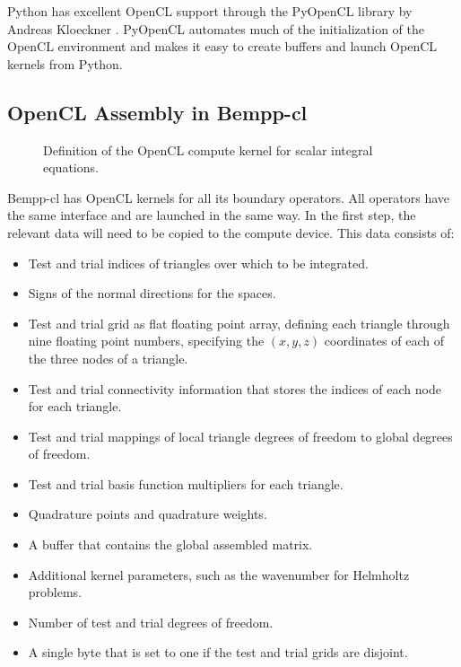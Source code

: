 Python has excellent OpenCL support through the PyOpenCL library by Andreas Kloeckner \cite{pyopencl}. PyOpenCL automates much of the initialization of the OpenCL environment and makes it easy to create buffers and launch OpenCL kernels from Python.

\subsection{OpenCL Assembly in Bempp-cl}

\begin{figure*}
	\center
	
	\caption{Definition of the OpenCL compute kernel for scalar integral equations.}
	\label{fig:kernel_definition}
\end{figure*}

Bempp-cl has OpenCL kernels for all its boundary operators. All operators have the same interface and are launched in the same way. In the first step, the relevant data will need to be copied to the compute device. This data consists of:

\begin{itemize}
	\item Test and trial indices of triangles over which to be integrated.
	\item Signs of the normal directions for the spaces.
	\item Test and trial grid as flat floating point array, defining each triangle through nine floating point numbers, specifying the $(x, y, z)$ coordinates of each of the three nodes of a triangle.
	\item Test and trial connectivity information that stores the indices of each node for each triangle.
	\item Test and trial mappings of local triangle degrees of freedom to global degrees of freedom.
	\item Test and trial basis function multipliers for each triangle.
	\item Quadrature points and quadrature weights.
	\item A buffer that contains the global assembled matrix.
	\item Additional kernel parameters, such as the wavenumber for Helmholtz problems.
	\item Number of test and trial degrees of freedom.
	\item A single byte that is set to one if the test and trial grids are disjoint.
\end{itemize}

